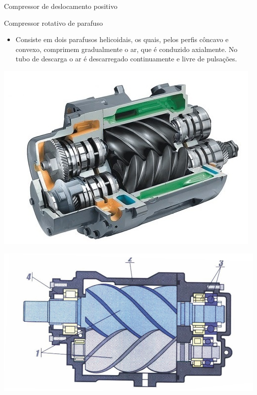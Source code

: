 \begin{frame}{Compressor de deslocamento positivo}
\begin{block}{Compressor rotativo de parafuso}
	\begin{itemize}
		\item Consiste em dois parafusos helicoidais, os quais, pelos perfis côncavo e convexo, comprimem gradualmente o ar, que é conduzido axialmente. No tubo de descarga o ar é descarregado continuamente e livre de pulsações.
	\end{itemize}
\end{block}

\begin{minipage}{0.45\linewidth}
	\centering
	\includegraphics[width=1\linewidth]{Figuras/Ch12/fig1}
\end{minipage}
\hfill
\begin{minipage}{0.45\linewidth}
	\centering
	\includegraphics[width=1\linewidth]{Figuras/Ch12/fig1n2}
\end{minipage}
\end{frame}


